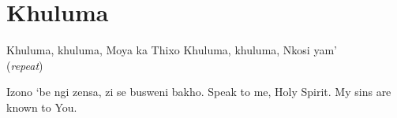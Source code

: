 \starttocol
\chapter{Khuluma}
\nexttocol
\hfill{\it }
\stoptocol
\starttocol
\startlines
K{\sc huluma}, khuluma, Moya ka Thixo
Khuluma, khuluma, Nkosi yam' \hfill({\it repeat})~~~~~~~~~

Izono `be ngi zensa, zi se busweni bakho.
\stoplines
\nexttocol
Speak to me, Holy Spirit. My  sins are known to You.
\stoptocol
